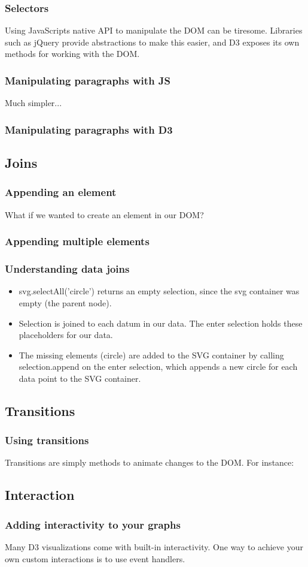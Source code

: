 \documentclass[red]{beamer}
\begin{document}
\begin{frame}
	\frametitle{Selectors}
    Using JavaScripts native API to manipulate the DOM can be tiresome. Libraries such as jQuery provide abstractions to make this easier, and D3 exposes its own methods for working with the DOM. 

\end{frame}

\begin{frame}
 	\frametitle{Manipulating paragraphs with JS}
		\lstll
\end{frame}

\begin{frame}
    Much simpler...
    \frametitle{Manipulating paragraphs with D3}
    \lstlll
\end{frame}

\subsection{Joins}
\begin{frame}
    \frametitle{Appending an element}
    What if we wanted to create an element in our DOM?

    \lstllll
\end{frame}

\begin{frame}
    \frametitle{Appending multiple elements}
    \lstlllll
\end{frame}

\begin{frame}
    \frametitle{Understanding data joins}
    \begin{itemize}
    \item<1 -> svg.selectAll('circle') returns an empty selection, since
    the svg container was empty (the parent node).
    \item<2 -> Selection is joined to each datum in our data. The enter selection holds these placeholders for our data.
    \item<3 -> The missing elements (circle) are added to the SVG container
    by calling selection.append on the enter selection, which appends a new
    circle for each data point to the SVG container. 
    \end{itemize}
\end{frame}

\subsection{Transitions}
\begin{frame}
    \frametitle{Using transitions}
    Transitions are simply methods to animate changes to the DOM. For instance:
    \lstllllll
\end{frame}

\subsection{Interaction}
\begin{frame}
    \frametitle{Adding interactivity to your graphs}
    Many D3 visualizations come with built-in interactivity. One way to achieve your own custom interactions is to use event handlers.

    \lstlllllll
\end{frame}
\end{document}
